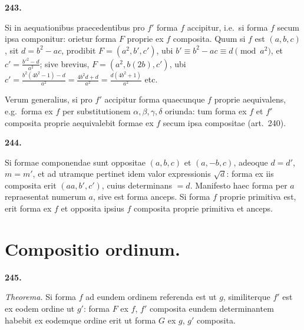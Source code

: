 \documentclass[12pt,a4paper]{article}
\theoremstyle{plain}
\theoremstyle{definition}
\theoremstyle{remark}
\begin{document}
\begin{center}\textbf{243.}\end{center}

Si in aequationibus praecedentibus pro $f'$ forma $f$ accipitur, i.e.\ si forma $f$ secum ipsa componitur: orietur forma $F$ proprie ex $f$ composita. Quum si $f$ est $(a, b, c)$, sit $d = b^{2} - ac$, prodibit $F = (a^{2}, b', c')$, ubi $b' \equiv b^{2} - ac \equiv d \pmod{a^{2}}$, et $c' = \tfrac{b'^{2} - d}{a^{2}}$; sive brevius, $F = (a^{2}, b(2b), c')$, ubi $c' = \tfrac{b^{2}(4b^{2} - 1) - d}{a^{2}} = \tfrac{4b^{2}d + d}{a^{2}} = \tfrac{d(4b^{2} + 1)}{a^{2}}$ etc.

Verum generalius, si pro $f'$ accipitur forma quaecunque $f$ proprie aequivalens, e.g.\ forma ex $f$ per substitutionem $\alpha, \beta, \gamma, \delta$ oriunda: tum forma ex $f$ et $f'$ composita proprie aequivalebit formae ex $f$ secum ipsa compositae (art.\ 240).

\begin{center}\textbf{244.}\end{center}

Si formae componendae sunt oppositae $(a, b, c)$ et $(a, -b, c)$, adeoque $d = d'$, $m = m'$, et ad utramque pertinet idem valor expressionis $\sqrt{d}$: forma ex iis composita erit $(aa, b', c')$, cuius determinans $= d$. Manifesto haec forma per $a$ repraesentat numerum $a$, sive est forma anceps. Si forma $f$ proprie primitiva est, erit forma ex $f$ et opposita ipsius $f$ composita proprie primitiva et anceps.


\newpage
\section*{Compositio ordinum.}
\begin{center}\textbf{245.}\end{center}

\textit{Theorema.} Si forma $f$ ad eundem ordinem referenda est ut $g$, similiterque $f'$ est ex eodem ordine ut $g'$: forma $F$ ex $f$, $f'$ composita eundem determinantem habebit ex eodemque ordine erit ut forma $G$ ex $g$, $g'$ composita.
\end{document}
